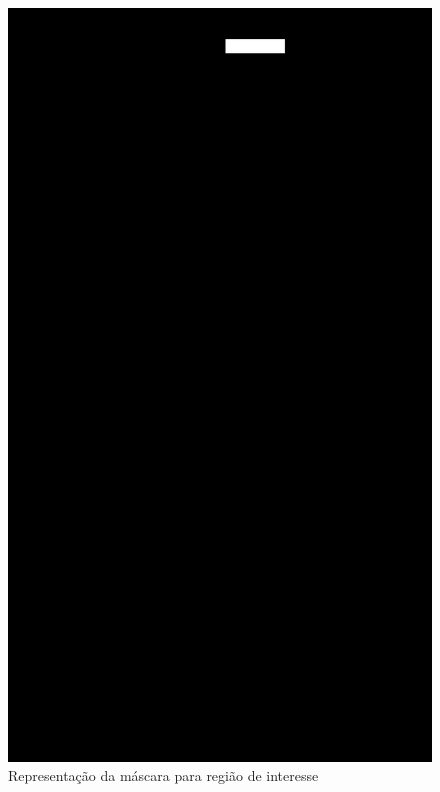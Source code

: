 \begin{figure}[H]
    \centering
    \caption{Representação da máscara para região de interesse }
        \begin{minipage}{\sizeImg\textwidth}
            \includegraphics[width=\textwidth]{figuras/ultrapassar_barra/134_mask_head.png}
        \end{minipage}
        \begin{minipage}{\sizeImg\textwidth}

\end{minipage}
\end{figure}
